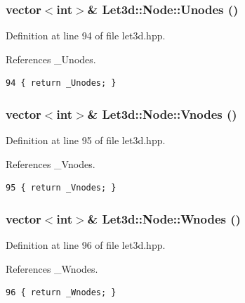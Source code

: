 \subsubsection{\setlength{\rightskip}{0pt plus 5cm}vector$<$int$>$\& Let3d::Node::Unodes ()\hspace{0.3cm}{\tt  [inline]}}\label{classLet3d_1_1Node_b0378ed097e88f4a10757bb0503af35a_b0378ed097e88f4a10757bb0503af35a}




Definition at line 94 of file let3d.hpp.

References \_\-Unodes.

\footnotesize\begin{verbatim}94 { return _Unodes; }
\end{verbatim}\normalsize 


\subsubsection{\setlength{\rightskip}{0pt plus 5cm}vector$<$int$>$\& Let3d::Node::Vnodes ()\hspace{0.3cm}{\tt  [inline]}}\label{classLet3d_1_1Node_0ac14aa83b42d181255da58425b5509b_0ac14aa83b42d181255da58425b5509b}




Definition at line 95 of file let3d.hpp.

References \_\-Vnodes.

\footnotesize\begin{verbatim}95 { return _Vnodes; }
\end{verbatim}\normalsize 


\subsubsection{\setlength{\rightskip}{0pt plus 5cm}vector$<$int$>$\& Let3d::Node::Wnodes ()\hspace{0.3cm}{\tt  [inline]}}\label{classLet3d_1_1Node_eff61124e41de07b2a437c02712734f5_eff61124e41de07b2a437c02712734f5}




Definition at line 96 of file let3d.hpp.

References \_\-Wnodes.

\footnotesize\begin{verbatim}96 { return _Wnodes; }
\end{verbatim}\normalsize 


